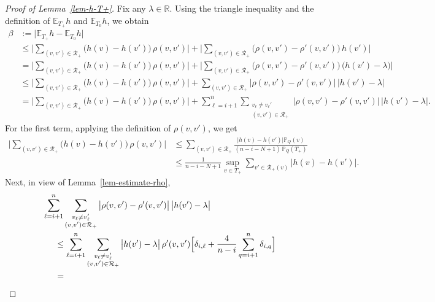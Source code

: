 \documentclass[12pt]{article}
\theoremstyle{definition}
\theoremstyle{plain}
\newcommand{\E}{\mathbb{E}}
\newcommand{\R}{\mathbb{R}}
\def\Prob{{\mathbb P}}
\def\relation{{\mathcal R}}
\begin{document}
\begin{proof}[Proof of Lemma~\ref{lem-h-T+}]
Fix any $\lambda\in\R$. 
Using the triangle inequality and the definition of $\E_{T_+} h$ and $\E_{T_0} h$, we obtain
\begin{align*}
\beta&:=\vert \E_{T_+} h-\E_{T_0} h\vert\\
&\leq 
\Big\vert \sum_{(v,v')\in \relation_+} \big(h(v)-h(v')\big)\, \rho(v,v')\Big\vert 
+ \Big\vert \sum_{(v,v')\in \relation_+} \big(\rho(v,v')-\rho'(v,v')\big)\, h(v')\Big\vert\\
&=\Big\vert \sum_{(v,v')\in \relation_+} \big(h(v)-h(v')\big)\, \rho(v,v')\Big\vert 
+ \Big\vert \sum_{(v,v')\in \relation_+} \big(\rho(v,v')-\rho'(v,v')\big)\, \big(h(v')-\lambda\big)\Big\vert\\
&\leq \Big\vert \sum_{(v,v')\in \relation_+} \big(h(v)-h(v')\big)\, \rho(v,v')\Big\vert 
+ \sum_{(v,v')\in \relation_+} \big\vert\rho(v,v')-\rho'(v,v')\big\vert\, \big\vert h(v')-\lambda\big\vert\\
&=\Big\vert \sum_{(v,v')\in \relation_+} \big(h(v)-h(v')\big)\, \rho(v,v')\Big\vert 
+\sum_{\ell=i+1}^n \sum_{\substack{v_\ell\neq v_{\ell}'\\(v,v')\in \relation_+}} \big\vert\rho(v,v')-\rho'(v,v')\big\vert\, \big\vert h(v')-\lambda\big\vert.
\end{align*}
For the first term, applying the definition of $\rho(v,v')$, we get
\begin{align*}
\Big\vert \sum_{(v,v')\in \relation_+} \big(h(v)-h(v')\big)\, \rho(v,v')\Big\vert
&\leq \sum_{(v,v')\in \relation_+}
\frac{\big|h(v)-h(v')\big|\Prob_Q(v)}{(n-i-N+1)\, \Prob_Q(T_+)}\\
&\leq \frac{1}{n-i-N+1}\sup\limits_{v\in T_+}\sum\limits_{v'\in \relation_+(v)}\big|h(v)-h(v')\big|.
\end{align*}
Next, in view of Lemma~\ref{lem-estimate-rho},
\begin{align*}
&\sum_{\ell=i+1}^n\sum_{\substack{v_\ell\neq v_{\ell}'\\(v,v')\in \relation_+}} \big\vert\rho(v,v')-\rho'(v,v')\big\vert\, \big\vert h(v')-\lambda\big\vert\\
&\hspace{0.5cm}\leq\sum_{\ell=i+1}^n \sum_{\substack{v_\ell\neq v_{\ell}'\\(v,v')\in \relation_+}} 
\big\vert h(v')-\lambda\big\vert\, \rho'(v,v') \Big[\delta_{i,\ell}+\frac{4}{n-i} \sum_{q=i+1}^n \delta_{i,q}\Big]\\
&\hspace{0.5cm}=

\end{align*}
\end{proof}
\end{document}
